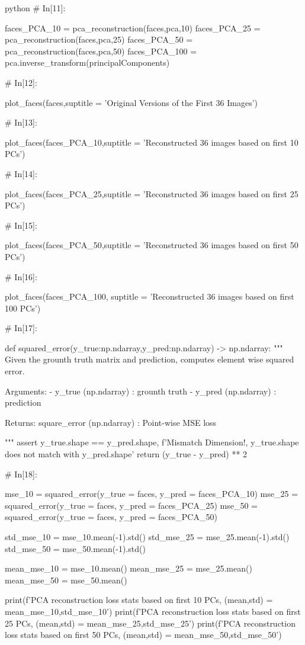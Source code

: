 \documentclass[12pt]{amsart}
\begin{document}
\begin{mintedbox}{python}
# In[11]:


faces_PCA_10 = pca_reconstruction(faces,pca,10)
faces_PCA_25 = pca_reconstruction(faces,pca,25)
faces_PCA_50 = pca_reconstruction(faces,pca,50)
faces_PCA_100 = pca.inverse_transform(principalComponents)


# In[12]:


plot_faces(faces,suptitle = 'Original Versions of the First 36 Images')


# In[13]:


plot_faces(faces_PCA_10,suptitle = 'Reconstructed 36 images based on first 10 PCs')


# In[14]:


plot_faces(faces_PCA_25,suptitle = 'Reconstructed 36 images based on first 25 PCs')


# In[15]:


plot_faces(faces_PCA_50,suptitle = 'Reconstructed 36 images based on first 50 PCs')


# In[16]:


plot_faces(faces_PCA_100, suptitle = 'Reconstructed 36 images based on first 100 PCs')


# In[17]:


def squared_error(y_true:np.ndarray,y_pred:np.ndarray) -> np.ndarray:
    """
        Given the grounth truth matrix and prediction, computes element wise squared error.
        
            
        Arguments:
            - y_true  (np.ndarray) : grounth truth
            - y_pred  (np.ndarray) : prediction
            
        Returns:
            square_error (np.ndarray) : Point-wise MSE loss
    
    """
    assert y_true.shape == y_pred.shape, f'Mismatch Dimension!, {y_true.shape} does not match with {y_pred.shape}'
    return (y_true - y_pred) ** 2


# In[18]:


mse_10 = squared_error(y_true = faces, y_pred = faces_PCA_10)
mse_25 = squared_error(y_true = faces, y_pred = faces_PCA_25)
mse_50 = squared_error(y_true = faces, y_pred = faces_PCA_50)


std_mse_10 = mse_10.mean(-1).std()
std_mse_25 = mse_25.mean(-1).std()
std_mse_50 = mse_50.mean(-1).std()

mean_mse_10 = mse_10.mean()
mean_mse_25 = mse_25.mean()
mean_mse_50 = mse_50.mean()


print(f'PCA reconstruction loss stats based on first 10 PCs, \n (mean,std) = {mean_mse_10,std_mse_10}')
print(f'PCA reconstruction loss stats based on first 25 PCs, \n (mean,std) = {mean_mse_25,std_mse_25}')
print(f'PCA reconstruction loss stats based on first 50 PCs, \n (mean,std) = {mean_mse_50,std_mse_50}')



\end{mintedbox}
\end{document}
